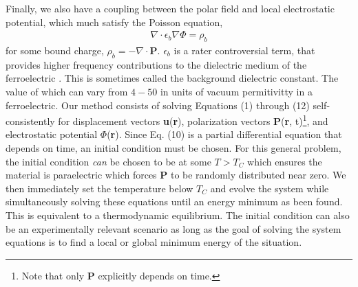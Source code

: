\documentclass[16pt]{article} %
\begin{document}
%
Finally, we also have a coupling between the polar field and local electrostatic potential, which much satisfy the Poisson equation,
%
\begin{align}\tag{12}\label{eqn:poisson}
\nabla \cdot \epsilon_b \nabla \Phi = \rho_b
\end{align}
%
for some bound charge, $\rho_b  = - \nabla \cdot \textbf{P}$. $\epsilon_b$ is a rater controversial term, that provides higher frequency contributions to the dielectric medium of the ferroelectric \cite{Baroni2001}.
%
This is sometimes called the background dielectric constant.
%
The value of which can vary from $4 - 50$ \cite{Eliseev2015} in units of vacuum permitivitty in a ferroelectric.
%
Our method consists of solving Equations (1) through (12) self-consistently for displacement vectors \textbf{u}(\textbf{r}), polarization vectors \textbf{P}(\textbf{r}, t)\footnote{Note that only \textbf{P} explicitly depends on time.}, and electrostatic potential $\Phi$(\textbf{r}).
%
Since Eq. (10) is a partial differential equation that depends on time, an initial condition must be chosen.
%
For this general problem, the initial condition \emph{can} be chosen to be at some $T > T_C$ which ensures the material is paraelectric which forces $\textbf{P}$ to be randomly distributed near zero.
%
We then immediately set the temperature below $T_C$ and evolve the system while simultaneously solving these equations until an energy minimum as been found.
%
This is equivalent to a thermodynamic equilibrium. 
%
The initial condition can also be an experimentally relevant scenario as long as the goal of solving the system equations is to find a local or global minimum energy of the situation.
%
\end{document}
